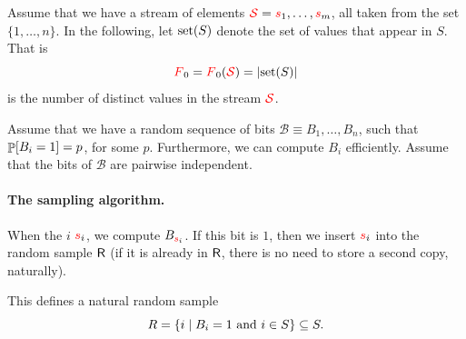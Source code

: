 Assume that we have a stream of elements
${\textcolor{red}{\mathcal{S}}} = {\textcolor{red}{{s}}}_1, \ldots, {\textcolor{red}{{s}}}_m$, all taken from the set
$\{1,\ldots, n\}$.  In the following, let $\distinctX{S}$ denote the
set of values that appear in $S$. That is
\begin{equation*}
    \Frq_0 = \Frq_0(\STRM) = \cardin{\distinctX{S}}
\end{equation*}
is the number of distinct values in the stream ${\textcolor{red}{\mathcal{S}}}$.



Assume that we have a random sequence of bits
$\mathcal{B} \equiv B_1, \ldots, B_n$, such that $\Prob{B_i=1} =p$,
for some $p$. Furthermore, we can compute $B_i$ efficiently. Assume
that the bits of $\mathcal{B}$ are pairwise independent.




\paragraph*{The sampling algorithm.}
When the $i$\th {} ${\textcolor{red}{{s}}}_i$, we compute $B_{{\textcolor{red}{{s}}}_i}$. If this
bit is $1$, then we insert ${\textcolor{red}{{s}}}_i$ into the random sample $\mathsf{R}$
(if it is already in $\mathsf{R}$, there is no need to store a second
copy, naturally).



This defines a natural random sample
\begin{equation*}
    R = \left\{ i \;\middle\vert\; B_i =1 \text{ and } i \in S \right\} \subseteq S.
\end{equation*}

